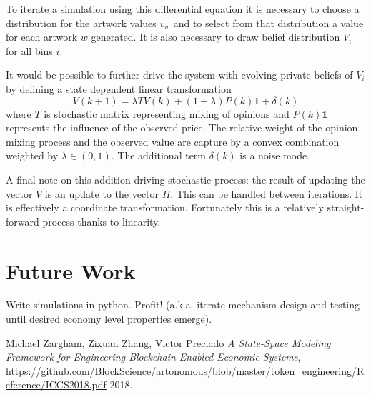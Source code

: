\documentclass[11pt]{amsart}
\begin{document}
To iterate a simulation using this differential equation it is necessary to choose a distribution for the artwork values $v_w$ and to select from that distribution a value for each artwork $w$ generated.  It is also necessary to draw belief distribution $V_i$ for all bins $i$.  

It would be possible to further drive the system with evolving private beliefs of $V_i$ by defining a state dependent linear transformation
\begin{equation}
V(k+1) =  \lambda T V(k) + (1-\lambda) P(k) \mathbf{1}  + \delta(k)
\end{equation}
where $T$ is stochastic matrix representing mixing of opinions and $P(k) \mathbf{1}$ represents the influence of the observed price. The relative weight of the opinion mixing process and the observed value are capture by a convex combination weighted by $\lambda\in (0,1)$. The additional term $\delta(k)$ is a noise mode.

A final note on this addition driving stochastic process: the result of updating the vector $V$ is an update to the vector $H$.  This can be handled between iterations. It is effectively a coordinate transformation. Fortunately this is a relatively straight-forward process thanks to linearity. 

\section{Future Work} 

Write simulations in python. Profit! (a.k.a. iterate mechanism design and testing until desired economy level properties emerge).

  \begin{thebibliography}{1}

   Michael Zargham, Zixuan Zhang, Victor Preciado {\em A State-Space Modeling Framework for Engineering Blockchain-Enabled Economic Systems}, \url{https://github.com/BlockScience/artonomous/blob/master/token_engineering/Reference/ICCS2018.pdf}  2018.

  \end{thebibliography}
\end{document}
